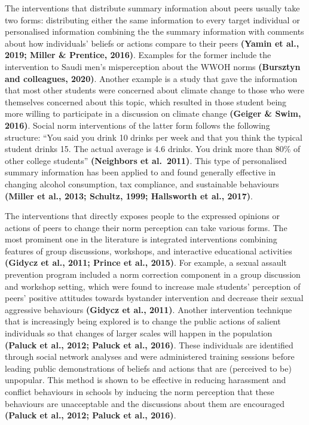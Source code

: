 \documentclass[
  11pt,
]{article}
\begin{document}
The interventions that distribute summary information about peers
usually take two forms: distributing either the same information to
every target individual or personalised information combining the the
summary information with comments about how individuals' beliefs or
actions compare to their peers \textbf{(Yamin et al., 2019; Miller \&
Prentice, 2016)}. Examples for the former include the intervention to
Saudi men's misperception about the WWOH norms \textbf{(Bursztyn and
colleagues, 2020)}. Another example is a study that gave the information
that most other students were concerned about climate change to those
who were themselves concerned about this topic, which resulted in those
student being more willing to participate in a discussion on climate
change \textbf{(Geiger \& Swim, 2016)}. Social norm interventions of the
latter form follows the following structure: ``You said you drink 10
drinks per week and that you think the typical student drinks 15. The
actual average is 4.6 drinks. You drink more than 80\% of other college
students'' \textbf{(Neighbors et al.~2011)}. This type of personalised
summary information has been applied to and found generally effective in
changing alcohol consumption, tax compliance, and sustainable behaviours
\textbf{(Miller et al., 2013; Schultz, 1999; Hallsworth et al., 2017)}.

The interventions that directly exposes people to the expressed opinions
or actions of peers to change their norm perception can take various
forms. The most prominent one in the literature is integrated
interventions combining features of group discussions, workshops, and
interactive educational activities \textbf{(Gidycz et al., 2011; Prince
et al., 2015)}. For example, a sexual assault prevention program
included a norm correction component in a group discussion and workshop
setting, which were found to increase male students' perception of
peers' positive attitudes towards bystander intervention and decrease
their sexual aggressive behaviours \textbf{(Gidycz et al., 2011)}.
Another intervention technique that is increasingly being explored is to
change the public actions of salient individuals so that changes of
larger scales will happen in the population \textbf{(Paluck et al.,
2012; Paluck et al., 2016)}. These individuals are identified through
social network analyses and were administered training sessions before
leading public demonstrations of beliefs and actions that are (perceived
to be) unpopular. This method is shown to be effective in reducing
harassment and conflict behaviours in schools by inducing the norm
perception that these behaviours are unacceptable and the discussions
about them are encouraged \textbf{(Paluck et al., 2012; Paluck et al.,
2016)}.
\end{document}
